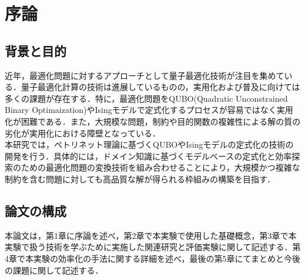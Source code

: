\chapter{序論}
\label{chap:introduction}


\section{背景と目的}
近年，最適化問題に対するアプローチとして量子最適化技術が注目を集めている．量子最適化計算の技術は進展しているものの，実用化および普及に向けては多くの課題が存在する．特に，最適化問題をQUBO(Quadratic Unconstrained Binary Optimaization)やIsingモデルで定式化するプロセスが容易ではなく実用化が困難である．また，大規模な問題，制約や目的関数の複雑性による解の質の劣化が実用化における障壁となっている．\\
本研究では，ペトリネット理論に基づくQUBOやIsingモデルの定式化の技術の開発を行う．具体的には，ドメイン知識に基づくモデルベースの定式化と効率探索のための最適化問題の変換技術を組み合わせることにより，大規模かつ複雑な制約を含む問題に対しても高品質な解が得られる枠組みの構築を目指す．
\section{論文の構成}
本論文は，第1章に序論を述べ，第2章で本実験で使用した基礎概念，第3章で本実験で扱う技術を学ぶために実施した関連研究と評価実験に関して記述する．第4章で本実験の効率化の手法に関する詳細を述べ，最後の第5章にてまとめと今後の課題に関して記述する．
